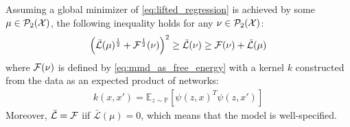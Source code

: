 \begin{proposition}\label{prop:inequality_mmd_loss}
	Assuming a global minimizer of \cref{eq:lifted_regression} is achieved by some $\mu\in \mathcal{P}_2({{\mathcal X}})$, the following inequality holds for any $\nu \in \mathcal{P}_2({{\mathcal X}})$:
	\begin{align}\label{eq:inequality_mmd_nn}
		\left(\bar{\mathcal{L}}(\mu)^{\frac{1}{2}} + {{\mathcal F}}^{\frac{1}{2}}(\nu)\right)^2
		\geq 
		\bar{\mathcal{L}}(\nu)
		\geq
		\mathcal{F}(\nu) + \bar{\mathcal{L}}(\mu)
	\end{align}
	where ${{\mathcal F}}(\nu)$ is defined by \cref{eq:mmd_as_free_energy} with  a kernel $k$  constructed from the data as an expected product of networks:
\begin{align}\label{eq:kernel_NN}
	k(x,x') = \mathbb{E}_{z\sim \mathbb{P}} [\psi(z,x)^T\psi(z,x')]
\end{align}
Moreover, $\bar{\mathcal{L}} = {{\mathcal F}}$ iif $\bar{\mathcal{L}}(\mu)=0$, which means that the model is well-specified. 
\end{proposition}
